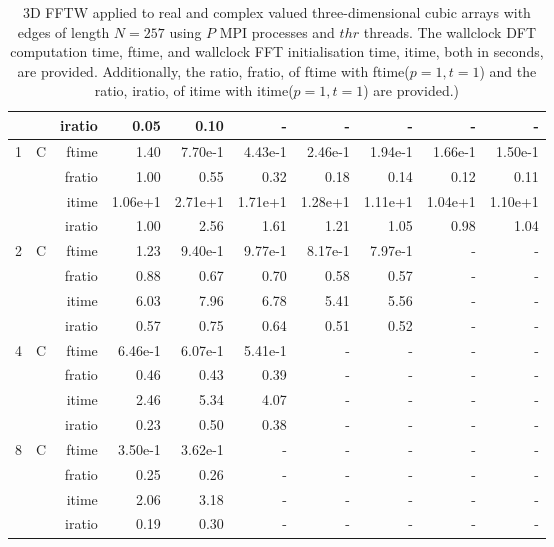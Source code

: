 \documentclass[a4paper]{article}
\begin{document}
\begin{table}[htbp]
\begin{center}
\begin{small}
\begin{tabular}{|r|r|r|r|r|r|r|r|r|r|}
             &             &  iratio &    0.05 &   0.10 &      - &      - &      - &      - &      - \\\hline\hline
   1 &   C &  ftime &    1.40  &    7.70e-1 &    4.43e-1 &    2.46e-1 &    1.94e-1 &    1.66e-1 &    1.50e-1 \\
             &             &  fratio &    1.00 &    0.55 &   0.32 &    0.18 &    0.14 &   0.12 &   0.11 \\
             &             &  itime &    1.06e+1 &   2.71e+1 &   1.71e+1 &   1.28e+1 &   1.11e+1 &   1.04e+1 &   1.10e+1 \\
             &             &  iratio &    1.00 &    2.56  &    1.61  &    1.21  &   1.05  &    0.98 &    1.04  \\\hline
   2 &  C &  ftime &    1.23  &    9.40e-1 &    9.77e-1 &    8.17e-1 &    7.97e-1 &      - &      - \\
             &             &  fratio &    0.88 &    0.67 &    0.70 &    0.58 &    0.57 &      - &      - \\
             &             &  itime &    6.03  &    7.96  &    6.78  &    5.41  &    5.56  &      - &      - \\
             &             &  iratio &    0.57 &    0.75 &    0.64 &    0.51 &    0.52 &      - &      - \\\hline
   4 &  C &  ftime &    6.46e-1 &    6.07e-1 &    5.41e-1 &      - &      - &      - &      - \\
             &             &  fratio &    0.46 &    0.43 &   0.39 &      - &      - &      - &      - \\
             &             &  itime &    2.46  &    5.34  &    4.07  &      - &      - &      - &      - \\
             &             &  iratio &    0.23 &    0.50 &    0.38 &      - &      - &      - &      - \\\hline
   8 &   C &  ftime &    3.50e-1 &    3.62e-1 &      - &      - &      - &      - &      - \\
             &             &  fratio &    0.25 &    0.26 &      - &      - &      - &      - &      - \\
             &             &  itime &    2.06  &    3.18  &      - &      - &      - &      - &      - \\
             &             &  iratio &    0.19 &    0.30 &      - &      - &      - &      - &      - \\\hline
\end{tabular}
\caption{3D FFTW applied to real and complex valued three-dimensional cubic arrays with edges of length $N=257$ using $P$ MPI processes and $thr$ threads. The wallclock DFT computation time, ftime, and wallclock FFT initialisation time, itime, both in seconds, are provided. Additionally, the ratio, fratio, of ftime  with ftime($p=1,t=1$) and the ratio, iratio, of itime  with itime($p=1,t=1$) are provided.) }\label{Tbl:FFTW3d257}
\end{small}
\end{center}
\end{table}
\end{document}
